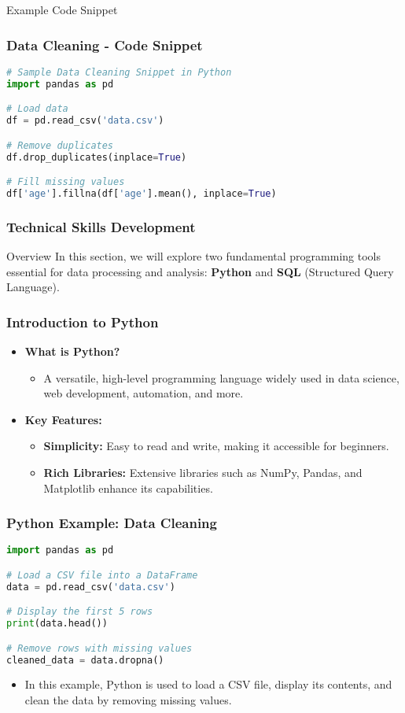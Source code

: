 \documentclass[aspectratio=169]{beamer}
\begin{document}
\begin{frame}[fragile]{Example Code Snippet}
    \frametitle{Data Cleaning - Code Snippet}
    \begin{lstlisting}[language=Python]
# Sample Data Cleaning Snippet in Python
import pandas as pd

# Load data
df = pd.read_csv('data.csv')

# Remove duplicates
df.drop_duplicates(inplace=True)

# Fill missing values
df['age'].fillna(df['age'].mean(), inplace=True)
    \end{lstlisting}
\end{frame}

\begin{frame}[fragile]
    \frametitle{Technical Skills Development}
    \begin{block}{Overview}
        In this section, we will explore two fundamental programming tools essential for data processing and analysis: \textbf{Python} and \textbf{SQL} (Structured Query Language).
    \end{block}
\end{frame}

\begin{frame}[fragile]
    \frametitle{Introduction to Python}
    \begin{itemize}
        \item \textbf{What is Python?} 
        \begin{itemize}
            \item A versatile, high-level programming language widely used in data science, web development, automation, and more.
        \end{itemize}
        \item \textbf{Key Features:}
        \begin{itemize}
            \item \textbf{Simplicity:} Easy to read and write, making it accessible for beginners.
            \item \textbf{Rich Libraries:} Extensive libraries such as NumPy, Pandas, and Matplotlib enhance its capabilities.
        \end{itemize}
    \end{itemize}
\end{frame}

\begin{frame}[fragile]
    \frametitle{Python Example: Data Cleaning}
    \begin{lstlisting}[language=Python]
import pandas as pd

# Load a CSV file into a DataFrame
data = pd.read_csv('data.csv')

# Display the first 5 rows
print(data.head())

# Remove rows with missing values
cleaned_data = data.dropna()
    \end{lstlisting}
    \begin{itemize}
        \item In this example, Python is used to load a CSV file, display its contents, and clean the data by removing missing values.
    \end{itemize}
\end{frame}
\end{document}
